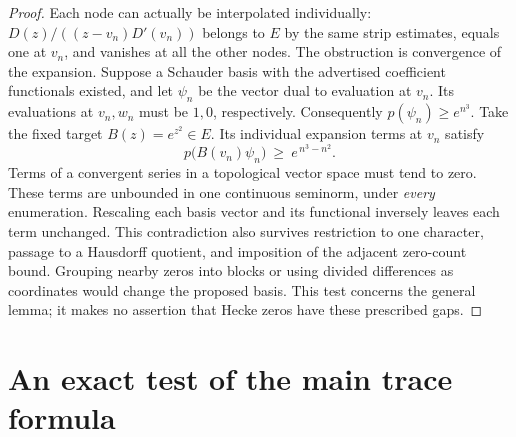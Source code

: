 \documentclass[11pt,reqno]{amsart}
\numberwithin{equation}{section}
\begin{document}
\begin{proof}
Each node can actually be interpolated individually: \(D(z)/((z-v_n)D'(v_n))\) belongs to \(E\) by the same strip estimates, equals one at \(v_n\), and vanishes at all the other nodes. The obstruction is convergence of the expansion. Suppose a Schauder basis with the advertised coefficient functionals existed, and let \(\psi_n\) be the vector dual to evaluation at \(v_n\). Its evaluations at \(v_n,w_n\) must be \(1,0\), respectively. Consequently \(p(\psi_n)\ge e^{n^3}\). Take the fixed target \(B(z)=e^{z^2}\in E\). Its individual expansion terms at \(v_n\) satisfy
\[
             p\bigl(B(v_n)\psi_n\bigr)\ \ge\ e^{\,n^3-n^2}.
\]
Terms of a convergent series in a topological vector space must tend to zero. These terms are unbounded in one continuous seminorm, under \emph{every} enumeration. Rescaling each basis vector and its functional inversely leaves each term unchanged. This contradiction also survives restriction to one character, passage to a Hausdorff quotient, and imposition of the adjacent zero-count bound. Grouping nearby zeros into blocks or using divided differences as coordinates would change the proposed basis. This test concerns the general lemma; it makes no assertion that Hecke zeros have these prescribed gaps.

\end{proof}

\section{An exact test of the main trace formula}\label{sec:3}
\end{document}
